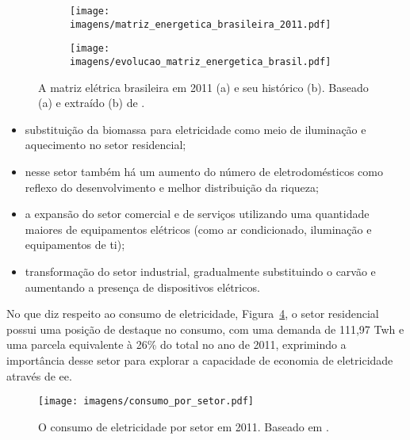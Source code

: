 \begin{figure}[h!t]
    \label{fig:eletricidade_brasil}
    \begin{center}
    \begin{subfigure}[c]{0.8\textwidth}
      \texttt{[image: imagens/matriz\_energetica\_brasileira\_2011.pdf]}
      \caption{}
      \label{fig:matriz_bra_2011}
    \end{subfigure}
    \hfill
    \begin{subfigure}[c]{0.8\textwidth}
      \texttt{[image: imagens/evolucao\_matriz\_energetica\_brasil.pdf]}
      \caption{}
      \label{fig:matriz_bra_evo}
    \end{subfigure}
  \end{center}
  \caption[Matriz energética brasileira.]{A matriz elétrica brasileira
em 2011 (a) e seu histórico (b). Baseado (a) e extraído (b) de \cite{ben2012}.}
\end{figure}

\begin{itemize}
\item substituição da biomassa para eletricidade como meio de iluminação 
e aquecimento
no setor residencial;
\item nesse setor também há um aumento do número de eletrodomésticos como
reflexo do desenvolvimento e melhor distribuição da riqueza;
\item a expansão do setor comercial e de serviços utilizando uma quantidade
maiores de equipamentos elétricos (como ar condicionado, iluminação e equipamentos
de \acs{ti}); 
\item transformação do setor industrial, gradualmente substituindo o carvão e 
aumentando a presença de dispositivos elétricos.
\end{itemize}

No que diz respeito ao consumo de eletricidade, 
Figura~\ref{fig:eletricidade_por_setor}, 
o setor residencial possui uma posição de destaque no consumo, com uma demanda
de 111,97 T\acs{wh} e uma parcela equivalente à 26\% do total no ano de 2011, 
exprimindo a importância desse setor para explorar a capacidade de economia de 
eletricidade através de \gls{ee}. 

\begin{figure}[h!t]
\centering
\texttt{[image: imagens/consumo\_por\_setor.pdf]}
\caption[Consumo de eletricidade por setor em 2011.]
{O consumo de eletricidade por setor em 2011. Baseado em \cite[pp. 32]{ben2012}.}
\label{fig:eletricidade_por_setor}
\end{figure}


